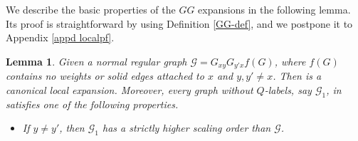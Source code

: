 \documentclass{article}
\newcommand{\1}{\mathds{1}}
\numberwithin{equation}{section}
\newcommand{\ord}{{\rm{ord}}}
\renewcommand{\cal}{\mathcal}
\renewcommand{\geq}{\geqslant}
\renewcommand{\ge}{\geq}
\theoremstyle{plain} %
\newtheorem{lemma}[theorem]{Lemma}
\theoremstyle{remark}
\begin{document}
 We describe the basic properties of the $GG$ expansions in the following lemma. Its proof is straightforward by using Definition \ref{GG-def}, and we postpone it to Appendix \ref{appd localpf}.
  \begin{lemma}\label{expandG2}
 Given a normal regular graph $\cal G = G_{xy}   G_{y' x } f(G)$, where $f(G)$ contains no weights or solid edges attached to $x$  and $y,y'\ne x$. %
Then \smash{${\cal O}_{GG}^{(x)}[ \cal G]$} is a canonical local expansion. %
Moreover, every graph without $Q$-labels, say $\cal G_1$, in \smash{${\cal O}_{GG}^{(x)}[ \cal G]$} satisfies one of the following properties. 
\begin{itemize}
\item[(a)] If $y\not = y'$, then $\cal G_1$ has a strictly higher scaling order than $\cal G$.



\end{itemize}
\end{lemma}
\end{document}
